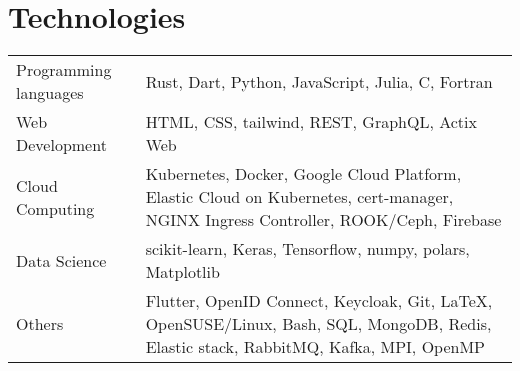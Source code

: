 \documentclass[10pt]{article}
\begin{document}
\section*{Technologies}

\begin{tabu} to \linewidth {lX}
Programming languages
& Rust, Dart, Python, JavaScript, Julia, C, Fortran \\
Web Development
& HTML, CSS, tailwind, REST, GraphQL, Actix Web \\
Cloud Computing
& Kubernetes, Docker, Google Cloud Platform, Elastic Cloud on
  Kubernetes, cert-manager, NGINX Ingress Controller, ROOK/Ceph, Firebase \\
Data Science
& scikit-learn, Keras, Tensorflow, numpy, polars, Matplotlib \\
Others
& Flutter, OpenID Connect, Keycloak, Git, {\LaTeX}, OpenSUSE/Linux, Bash, SQL,
  MongoDB, Redis, Elastic stack, RabbitMQ, Kafka, MPI, OpenMP \\
\end{tabu}
\end{document}
